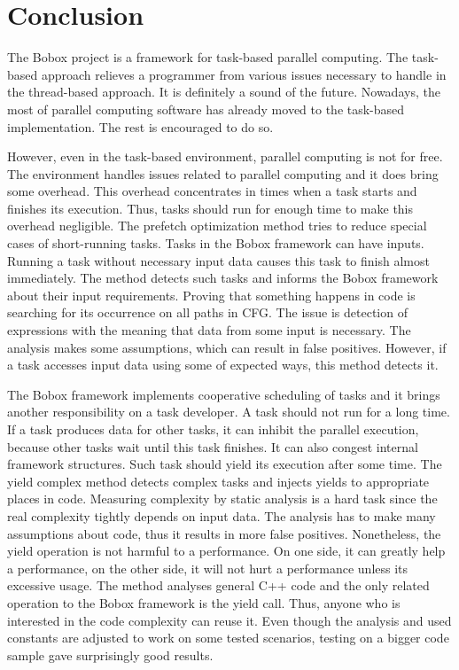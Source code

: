 \chapter{Conclusion}
The Bobox project is a framework for task-based parallel computing. The task-based approach relieves a programmer from various issues necessary to handle in the thread-based approach. It is definitely a sound of the future. Nowadays, the most of parallel computing software has already moved to the task-based implementation. The rest is encouraged to do so.

However, even in the task-based environment, parallel computing is not for free. The environment handles issues related to parallel computing and it does bring some overhead. This overhead concentrates in times when a task starts and finishes its execution. Thus, tasks should run for enough time to make this overhead negligible. The prefetch optimization method tries to  reduce special cases of short-running tasks. Tasks in the Bobox framework can have inputs. Running a task without necessary input data causes this task to finish almost immediately. The method detects such tasks and informs the Bobox framework about their input requirements. Proving that something happens in code is searching for its occurrence on all paths in CFG. The issue is detection of expressions with the meaning that data from some input is necessary. The analysis makes some assumptions, which can result in false positives. However, if a task accesses input data using some of expected ways, this method detects it.

The Bobox framework implements cooperative scheduling of tasks and it brings another responsibility on a task developer. A task should not run for a long time. If a task produces data for other tasks, it can inhibit the parallel execution, because other tasks wait until this task finishes. It can also congest internal framework structures. Such task should yield its execution after some time. The yield complex method detects complex tasks and injects yields to appropriate places in code. Measuring complexity by static analysis is a hard task since the real complexity tightly depends on input data. The analysis has to make many assumptions about code, thus it results in more false positives. Nonetheless, the yield operation is not harmful to a performance. On one side, it can greatly help a performance, on the other side, it will not hurt a performance unless its excessive usage. The method analyses general C++ code and the only related operation to the Bobox framework is the yield call. Thus, anyone who is interested in the code complexity can reuse it. Even though the analysis and used constants are adjusted to work on some tested scenarios, testing on a bigger code sample gave surprisingly good results.

